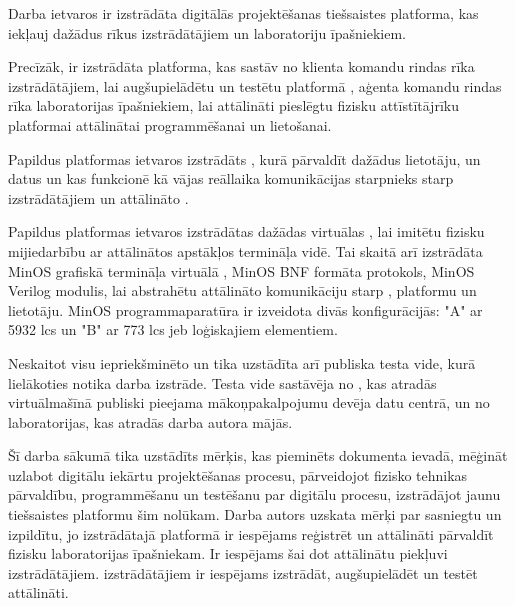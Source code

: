 Darba ietvaros ir izstrādāta digitālās  projektēšanas
tiešsaistes platforma, kas iekļauj dažādus rīkus 
izstrādātājiem un  laboratoriju īpašniekiem.
\cite{VeinbahsKrisjanisTestbed}

Precīzāk, ir izstrādāta platforma, kas sastāv no klienta komandu rindas rīka
izstrādātājiem, lai augšupielādētu un testētu platformā
, aģenta komandu rindas rīka laboratorijas
īpašniekiem, lai attālināti pieslēgtu fizisku attīstītājrīku
 platformai attālinātai programmēšanai un lietošanai.

Papildus platformas ietvaros izstrādāts , kurā
pārvaldīt dažādus lietotāju,  un
 datus un kas funkcionē kā vājas reāllaika
komunikācijas starpnieks starp izstrādātājiem un attālināto
.

Papildus platformas ietvaros izstrādātas dažādas virtuālas
, lai imitētu fizisku mijiedarbību ar
 attālinātos apstākļos termināļa vidē. Tai skaitā arī
izstrādāta MinOS grafiskā termināļa virtuālā ,
MinOS BNF formāta protokols, MinOS Verilog
 modulis, lai abstrahētu attālināto
komunikāciju starp , platformu un lietotāju. MinOS
programmaparatūra ir izveidota divās konfigurācijās: "A" ar 5932 \gls{lcs} un
"B" ar 773 \gls{lcs} jeb loģiskajiem elementiem.

Neskaitot visu iepriekšminēto  un
 tika uzstādīta arī publiska testa vide, kurā
lielākoties notika darba izstrāde. Testa vide sastāvēja no
, kas atradās virtuālmašīnā publiski pieejama
mākoņpakalpojumu devēja datu centrā, un no laboratorijas, kas atradās darba autora
mājās. \cite{VeinbahsKrisjanisProduction}

Šī darba sākumā tika uzstādīts mērķis, kas pieminēts dokumenta ievadā, mēģināt
uzlabot digitālu iekārtu projektēšanas procesu, pārveidojot fizisko tehnikas
pārvaldību, programmēšanu un testēšanu par digitālu procesu, izstrādājot jaunu
tiešsaistes platformu šim nolūkam. Darba autors uzskata mērķi par sasniegtu un
izpildītu, jo izstrādātajā platformā ir iespējams reģistrēt un attālināti
pārvaldīt fizisku  laboratorijas īpašniekam. Ir
iespējams šai  dot attālinātu piekļuvi
izstrādātājiem.  izstrādātājiem ir
iespējams izstrādāt, augšupielādēt un testēt
 attālināti. 

